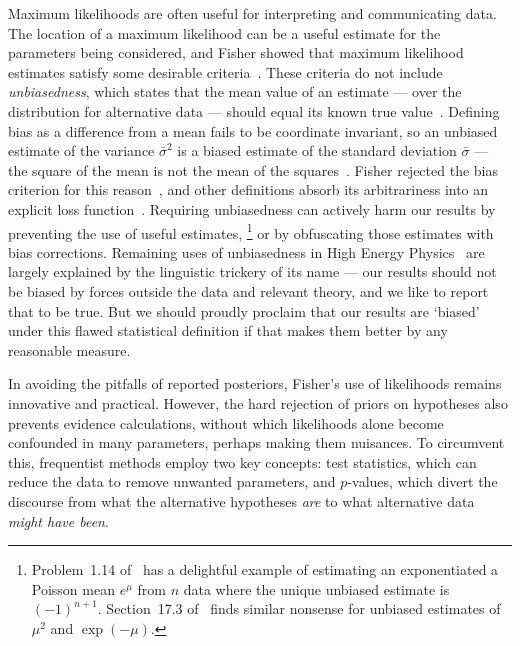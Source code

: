 Maximum likelihoods are often useful for interpreting and communicating data.
The location of a maximum likelihood can be a useful estimate for the
parameters being considered, and Fisher showed that maximum likelihood
estimates satisfy some desirable criteria~\cite{fisher1922estimators}.
These criteria do not include \emph{unbiasedness}, which states that the mean
value of an estimate --- over the distribution for alternative data --- should
equal its known true value~\cite{
sheynin1989aa,
Neyman1937Outline,
pdg2022ynf
}.
Defining bias as a difference from a mean fails to be coordinate invariant,
so an unbiased estimate of the variance $\bar{\sigma}^2$ is a biased
estimate of the standard deviation $\bar{\sigma}$ --- the square of the mean
is not the mean of the squares~\cite{barlow2019svl}.
Fisher rejected the bias criterion for this
reason~\cite{jaynes2003probability}, and other definitions absorb its
arbitrariness into an explicit loss function~\cite{lehmann2005testing}.
Requiring unbiasedness can actively harm our results by preventing the use of
useful estimates,%
\footnote{%
Problem~1.14 of~\cite{lehmann2005testing} has a delightful example of
estimating an exponentiated a Poisson mean $e^\mu$ from $n$ data
where the unique unbiased estimate is $(-1)^{n + 1}$.
Section~17.3 of~\cite{jaynes2003probability} finds similar nonsense for
unbiased estimates of $\mu^2$ and $\exp(-\mu)$.%
}
or by obfuscating those estimates with bias corrections.
Remaining uses of unbiasedness in High Energy Physics~\cite{
pdg2022ynf,
Tullythesis,
lhcb2018563,
LHCb:2021trn,
LHCb:2015yax
}
are largely explained by the linguistic trickery of its name --- our
results should not be biased by forces outside the data and relevant theory,
and we like to report that to be true.
But we should proudly proclaim that our results are `biased' under this flawed
statistical definition if that makes them better by any reasonable measure.

In avoiding the pitfalls of reported posteriors, Fisher's use of likelihoods
remains innovative and practical.
However, the hard rejection of priors on hypotheses also prevents evidence
calculations, without which likelihoods alone become confounded in many
parameters, perhaps making them nuisances.
To circumvent this, frequentist methods employ two key concepts:
test statistics, which can reduce the data to remove unwanted parameters,
and $p$-values, which divert the discourse
from what the alternative hypotheses \emph{are}
to what alternative data \emph{might have been}.

